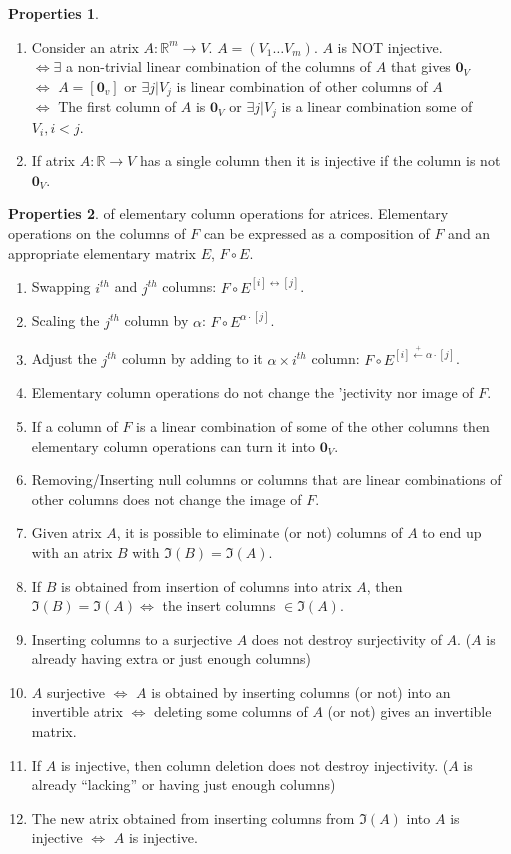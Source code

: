 \documentclass{article}
\theoremstyle{definition}
\newtheorem{prop}{Properties}[section]
\newcommand{\R}{\mathbb{R}}
\begin{document}
\begin{prop}
\begin{enumerate}
	\item Consider an atrix $A : \R^m \rightarrow V$. $A = (V_1\dots V_m)$. $A$ is NOT injective.\\
	$\iff \exists$ a non-trivial linear combination of the columns of $A$ that gives $\mathbf{0}_V$\\
	$\iff$ $A = [\mathbf{0}_v]$ or $\exists j \vert V_j$ is linear combination of other columns of $A$\\
	$\iff$ The first column of $A$ is $\mathbf{0}_V$ or $\exists j \vert V_j$ is a linear combination some of $V_i, i < j$.
	\item If atrix $A: \R \rightarrow V$ has a single column then it is injective if the column is not $\mathbf{0}_V$.
	\end{enumerate}
\end{prop}
\begin{prop}
	of elementary column operations for atrices. Elementary operations on the columns of $F$ can be expressed as a composition of $F$ and an appropriate elementary matrix $E$, $F\circ E$. 
	\begin{enumerate}
		\item Swapping $i^{th}$ and $j^{th}$ columns: $F\circ E^{[i]\leftrightarrow[j]}$.
		\item Scaling the $j^{th}$ column by $\alpha$: $F\circ E^{\alpha\cdot[j]}$.
		\item Adjust the $j^{th}$ column by adding to it $\alpha\times i^{th}$ column: $F\circ E^{[i]\stackrel{+}\leftarrow \alpha\cdot[j]}$.
		\item Elementary column operations do not change the 'jectivity nor image of $F$.
		\item If a column of $F$ is a linear combination of some of the other columns then elementary column operations can turn it into $\mathbf{0}_V$.
		\item Removing/Inserting null columns or columns that are linear combinations of other columns does not change the image of $F$.
		\item Given atrix $A$, it is possible to eliminate (or not) columns of $A$ to end up with an atrix $B$ with $\Im(B) = \Im(A)$.
		\item If $B$ is obtained from insertion of columns into atrix $A$, then $\Im(B) = \Im(A) \iff$ the insert columns $\in \Im(A)$.
		\item Inserting columns to a surjective $A$ does not destroy surjectivity of $A$. ($A$ is already having extra or just enough columns) 
		\item $A$ surjective $\iff$ $A$ is obtained by inserting columns (or not) into an invertible atrix $\iff$ deleting some columns of $A$ (or not) gives an invertible matrix.
		\item If $A$ is injective, then column deletion does not destroy injectivity. ($A$ is already ``lacking'' or having just enough columns)
		\item The new atrix obtained from inserting columns from $\Im(A)$ into $A$ is injective $\iff$ $A$ is injective.
	\end{enumerate}
\end{prop}
\end{document}
